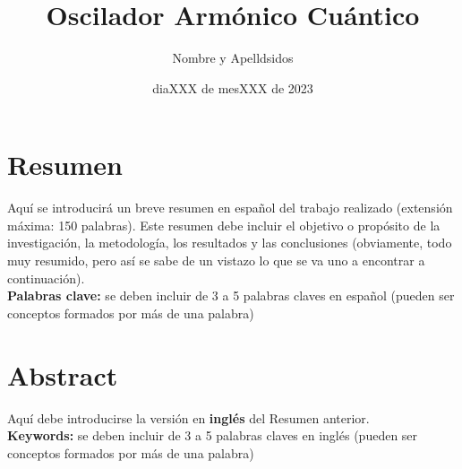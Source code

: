 \documentclass[11pt,a4paper,spanish]{book}
\title{Oscilador Armónico Cuántico}
\author{Nombre y Apelldsidos}
\date{diaXXX de mesXXX de 2023}
\begin{document}
\renewcommand{\listfigurename}{Índice de figuras}
\renewcommand{\listtablename}{Índice de tablas}
\renewcommand{\contentsname}{Índice de contenidos}
\renewcommand{\figurename}{Figura}
\renewcommand{\tablename}{Tabla} 

\maketitle

\frontmatter
\tableofcontents
\listoffigures %
\listoftables %





\chapter{Resumen}


Aquí se introducirá un breve resumen en español del trabajo realizado (extensión máxima: 150 palabras). Este resumen debe incluir el objetivo o propósito de la investigación, la metodología, los resultados y las conclusiones (obviamente, todo muy resumido, pero así se sabe de un vistazo lo que se va uno a encontrar a continuación).\\


{\bf Palabras clave:} se deben incluir de 3 a 5 palabras claves en español (pueden ser conceptos formados por más de una palabra)

\chapter{Abstract}
Aquí debe introducirse la versión en {\bf inglés} del Resumen anterior.\\


{\bf Keywords:} se deben incluir de 3 a 5 palabras claves en inglés  (pueden ser conceptos formados por más de una palabra)




\mainmatter
\end{document}
